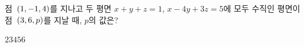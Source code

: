 점~$(1{,}\mkern3mu\mathopen{}-1{,}\mkern3mu\mathopen{}4)$를 지나고 두 평면 $x+y+z=1$, $x-4y+3z=5$에 모두 수직인 평면이 점~$(3{,}\mkern3mu\mathopen{}6{,}\mkern3mu\mathopen{}p)$를 지날 때, $p$의 값은?
\begin{choices32}{$2$}{$3$}{$4$}{$5$}{$6$}\end{choices32}
